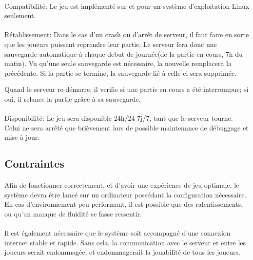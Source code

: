 \documentclass[a4paper,11pt]{report}
\begin{document}
\paragraph{}Compatibilité:  \newline
Le jeu est implémenté sur et pour un système d'exploitation Linux seulement.

\paragraph{}Rétablissement:  \newline
Dans le cas d'un crash ou d'arrêt de serveur, il faut faire en sorte que les joueurs puissent reprendre leur partie. Le serveur fera donc une sauvegarde automatique à chaque debut de journée(de la partie en cours, 7h du matin). 
Vu qu'une seule sauvegarde est nécessaire, la nouvelle remplacera la précédente.
Si la partie se termine, la sauvegarde lié à celle-ci sera supprimée.

Quand le serveur re-démarre, il verifie si une partie en cours a été interrompue; si oui, il relance la partie grâce à sa sauvegarde.

\paragraph{}Disponibilité:  \newline
Le jeu sera disponible 24h/24 7j/7, tant que le serveur tourne. Celui ne sera arrêté que brièvement lors de possible maintenance de débuggage et mise à jour.

\subsection{Contraintes}
\paragraph{}
Afin de fonctionner correctement, et d’avoir une expérience de jeu optimale, le système devra être lancé sur un ordinateur possédant la configuration nécessaire.
En cas d’environnement peu performant, il est possible que des ralentissements, ou qu’un manque de fluidité se fasse ressentir.
\paragraph{}
Il est également nécessaire que le système soit accompagné d’une connexion internet stable et rapide.
Sans cela, la communication avec le serveur et entre les joueurs serait endommagée, et endommagerait la jouabilité de tous les joueurs.
\end{document}

